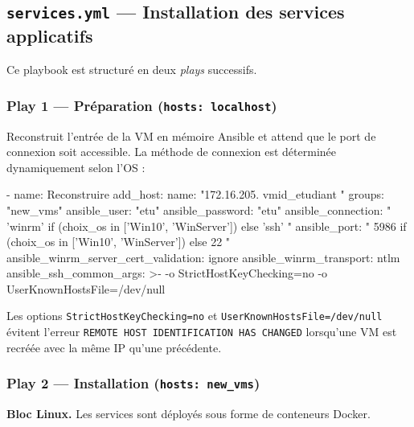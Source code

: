 \documentclass[a4paper]{article}
\newcommand{\cmd}[1]{\texttt{#1}}
\begin{document}
\subsection{\texttt{services.yml} --- Installation des services applicatifs}
\label{sec:services}

Ce playbook est structuré en deux \textit{plays} successifs.

\subsubsection*{Play 1 --- Préparation (\texttt{hosts: localhost})}

Reconstruit l'entrée de la VM en mémoire Ansible et attend que le port de connexion soit accessible. La méthode de connexion est déterminée dynamiquement selon l'OS :

\begin{yamlcode}
- name: Reconstruire
  add_host:
    name:                 "172.16.205.{{ vmid_etudiant }}"
    groups:               "new_vms"
    ansible_user:         "etu"
    ansible_password:     "etu"
    ansible_connection:   "{{ 'winrm' if (choix_os in
                          ['Win10', 'WinServer']) else 'ssh' }}"
    ansible_port:         "{{ 5986 if (choix_os in
                          ['Win10', 'WinServer']) else 22 }}"
    ansible_winrm_server_cert_validation: ignore
    ansible_winrm_transport: ntlm
    ansible_ssh_common_args: >-
      -o StrictHostKeyChecking=no -o UserKnownHostsFile=/dev/null
\end{yamlcode}

Les options \cmd{StrictHostKeyChecking=no} et \cmd{UserKnownHostsFile=/dev/null} évitent l'erreur \cmd{REMOTE HOST IDENTIFICATION HAS CHANGED} lorsqu'une VM est recréée avec la même IP qu'une précédente.

\subsubsection*{Play 2 --- Installation (\texttt{hosts: new\_vms})}

\textbf{Bloc Linux.} Les services sont déployés sous forme de conteneurs Docker.
\end{document}
